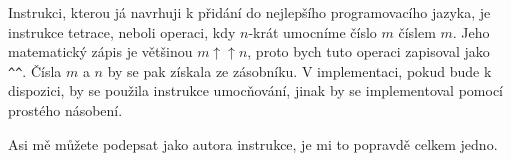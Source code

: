 \documentclass{fkssolpub}
\author{Ondřej Sedláček}
\begin{document}
 

Instrukci, kterou já navrhuji k přidání do nejlepšího programovacího jazyka, je instrukce
tetrace, neboli operaci, kdy $n$-krát umocníme číslo $m$ číslem $m$. Jeho matematický zápis
je většinou $m \mathbin{\uparrow \uparrow} n$, proto bych tuto operaci zapisoval jako 
\verb|^^|. Čísla $m$ a $n$ by se pak získala ze zásobníku. V implementaci, pokud bude k 
dispozici, by se použila instrukce umocňování, jinak by se implementoval pomocí prostého 
násobení.

Asi mě můžete podepsat jako autora instrukce, je mi to popravdě celkem jedno.
\end{document}
